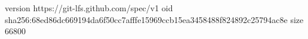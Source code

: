 version https://git-lfs.github.com/spec/v1
oid sha256:68ed86dc669194da6f50cc7afffe15969ccb15ea3458488f824892c25794ac8e
size 66800

